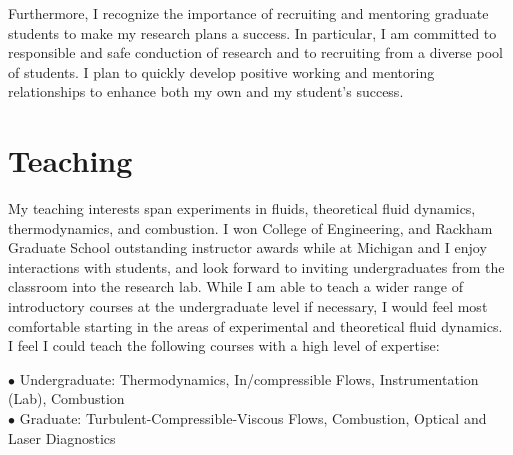 \documentclass[11pt,a4paper,sans]{moderncv} %
\begin{document}
Furthermore, I recognize the importance of recruiting and mentoring graduate students to make my research plans a success. In particular, I am committed to responsible and safe conduction of research and to recruiting from a diverse pool of students. I plan to quickly develop positive working and mentoring relationships to enhance both my own and my student's success. %
\section{Teaching}
My teaching interests span experiments in fluids, theoretical fluid dynamics, thermodynamics, and combustion.  I won College of Engineering, and Rackham Graduate School outstanding instructor awards while at Michigan and I enjoy interactions with students, and look forward to inviting undergraduates from the classroom into the research lab. While I am able to teach a wider range of introductory courses at the undergraduate level if necessary, I would feel most comfortable starting in the areas of experimental and theoretical fluid dynamics. I feel I could teach the following courses with a high level of expertise:

$\bullet{}$ Undergraduate: Thermodynamics, In/compressible Flows, Instrumentation (Lab), Combustion\\
$\bullet{}$ Graduate: Turbulent-Compressible-Viscous Flows, Combustion, Optical and Laser Diagnostics
\end{document}
